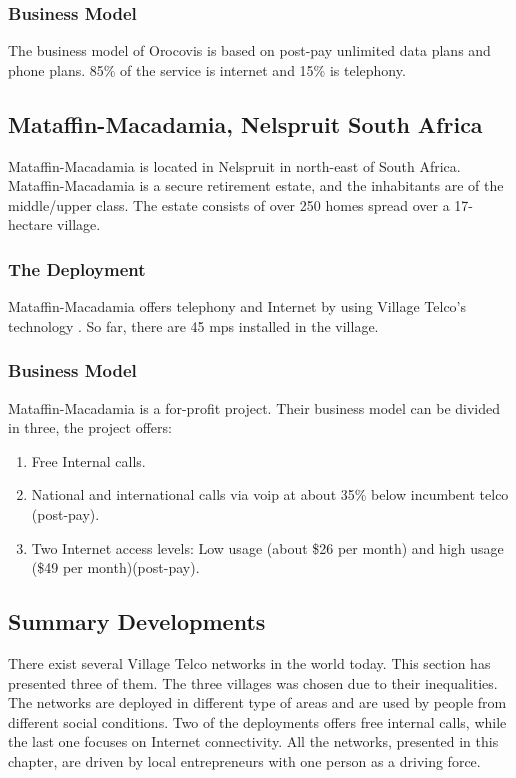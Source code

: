 \subsubsection{Business Model}
The business model of Orocovis is based on post-pay unlimited data plans and phone plans. 85\% of the service is internet and 15\% is telephony. 

\subsection{Mataffin-Macadamia, Nelspruit South Africa}
Mataffin-Macadamia is located in Nelspruit in north-east of South Africa. Mataffin-Macadamia is a secure retirement estate, and the inhabitants are of the middle/upper class. The estate consists of over 250 homes spread over a 17-hectare village. 

\subsubsection{The Deployment}
Mataffin-Macadamia offers telephony and Internet by using Village Telco's technology \cite{mataffinict}. So far, there are 45 \glspl{mp} installed in the village.

\subsubsection{Business Model}
Mataffin-Macadamia is a for-profit project. Their business model can be divided in three, the project offers: 
\begin{enumerate}
\item Free Internal calls.
\item National and international calls via \gls{voip} at about 35\% below incumbent telco (post-pay).
\item Two Internet access levels: Low usage (about \$26 per month) and high usage (\$49 per month)(post-pay).
\end{enumerate}

\subsection{Summary Developments}
There exist several Village Telco networks in the world today. This section has presented three of them. The three villages was chosen due to their inequalities. The networks are deployed in different type of areas and are used by people from different social conditions. Two of the deployments offers free internal calls, while the last one focuses on Internet connectivity. All the networks, presented in this chapter, are driven by local entrepreneurs with one person as a driving force.

